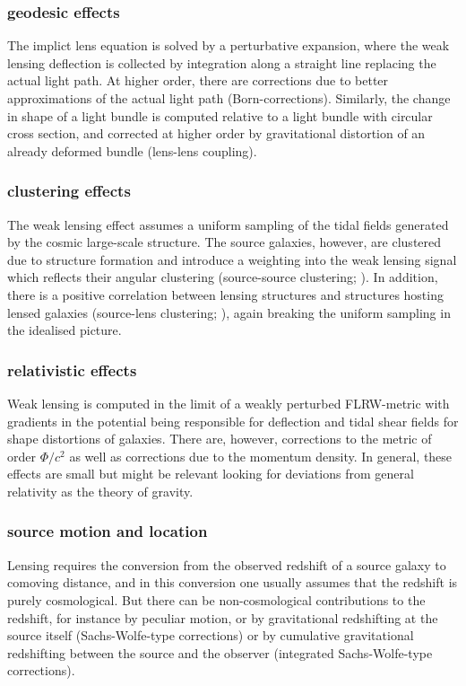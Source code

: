 \subsubsection{geodesic effects}

The implict lens equation is solved by a perturbative expansion, where the weak
lensing deflection is collected by integration along a straight line replacing
the actual light path. At higher order, there are corrections due to better
approximations of the actual light path (Born-corrections). Similarly, the
change in shape of a light bundle is computed relative to a light bundle with
circular cross section, and corrected at higher order by gravitational
distortion of an already deformed bundle (lens-lens coupling).


\subsubsection{clustering effects}
The weak lensing effect assumes a uniform sampling of the tidal fields generated by the cosmic large-scale structure. The source galaxies, however, are clustered due to structure formation and introduce a weighting into the weak lensing  signal which reflects their angular clustering (source-source clustering; \cite{2002A&A...389..729S}). In addition, there is a positive correlation between lensing structures and structures hosting lensed galaxies (source-lens clustering; \cite{1998A&A...338..375B}), again breaking the uniform sampling in the idealised picture.


\subsubsection{relativistic effects}
Weak lensing is computed in the limit of a weakly perturbed FLRW-metric with gradients in the potential being responsible for deflection and tidal shear fields for shape distortions of galaxies. There are, however, corrections to the metric of order $\Phi/c^2$ as well as corrections due to the momentum density. In general, these effects are small but might be relevant looking for deviations from general relativity as the theory of gravity.


\subsubsection{source motion and location}
Lensing requires the conversion from the observed redshift of a source galaxy to comoving distance, and in this conversion one usually assumes that the redshift is purely cosmological. But there can be non-cosmological contributions to the redshift, for instance by peculiar motion, or by gravitational redshifting at the source itself (Sachs-Wolfe-type corrections) or by cumulative gravitational redshifting between the source and the observer (integrated Sachs-Wolfe-type corrections).

